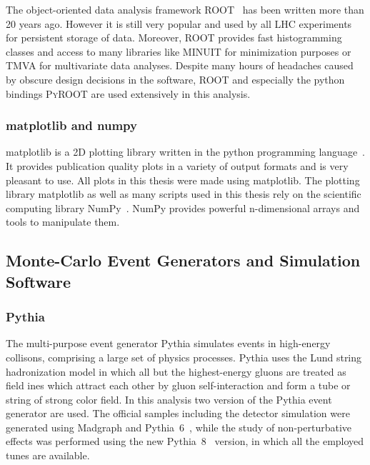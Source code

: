The object-oriented data analysis framework ROOT~\cite{Brun:1997pa} has been
written more than 20 years ago. However it is still very popular and used by all
LHC experiments for persistent storage of data. Moreover, ROOT provides fast
histogramming classes and access to many libraries like MINUIT for minimization
purposes or TMVA for multivariate data analyses. Despite many hours of headaches
caused by obscure design decisions in the software, ROOT and especially the
python bindings \textsc{PyROOT} are used extensively in this analysis.

\subsubsection{matplotlib and numpy}

matplotlib is a 2D plotting library written in the python programming language~\cite{Hunter:2007aa}. It
provides publication quality plots in a variety of output formats and is very
pleasant to use. All plots in this thesis were made using matplotlib. The
plotting library matplotlib as well as many scripts used in this thesis rely on
the scientific computing library NumPy~\cite{Oliphant:2007aa}. NumPy provides
powerful n-dimensional arrays and tools to manipulate them. 

\subsection{Monte-Carlo Event Generators and Simulation Software}
\label{subsection:mc_generators}

\subsubsection{Pythia}

The multi-purpose event generator Pythia simulates events in high-energy
collisons, comprising a large set of physics processes. Pythia uses the Lund
string hadronization model in which all but the highest-energy gluons are
treated as field ines which attract each other by gluon self-interaction and
form a tube or string of strong color field. In this analysis two version of the
Pythia event generator are used. The official samples including the detector
simulation were generated using Madgraph and Pythia~6~\cite{Sjostrand:2006za},
while the study of non-perturbative effects was performed using the new
Pythia~8~\cite{Sjostrand:2007gs} version, in which all the employed tunes are
available. 

